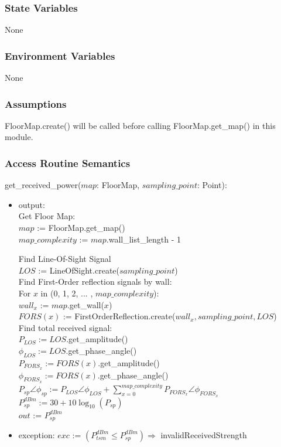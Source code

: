 \documentclass[12pt, titlepage]{article}
\begin{document}
\subsubsection{State Variables} None

\subsubsection{Environment Variables} None

\subsubsection{Assumptions} FloorMap.create() will be called before calling FloorMap.get\_map() in this module.

\subsubsection{Access Routine Semantics}

\noindent get\_received\_power($map$: FloorMap, $sampling\_point$: Point):
\begin{itemize}
\item output:\\
Get Floor Map:\\
$map$ := FloorMap.get\_map()\\
$map\_complexity$ := $map$.wall\_list\_length - 1

Find Line-Of-Sight Signal\\
$LOS$ := LineOfSight.create($sampling\_point$)\\

Find First-Order reflection signals by wall:\\
For $x$ in (0, 1, 2, ... , $map\_complexity$):\\
$wall_x$ := $map$.get\_wall($x$)\\
$FORS(x)$ := FirstOrderReflection.create($wall_x, sampling\_point, LOS$)\\

Find total received signal:\\
$P_{LOS} := LOS.$get\_amplitude()\\
$\phi_{LOS} := LOS.$get\_phase\_angle()\\
$P_{FORS_x} := FORS(x).$get\_amplitude()\\
$\phi_{FORS_x} := FORS(x).$get\_phase\_angle()\\
$P_{sp}\angle\phi_{sp} := P_{LOS}\angle\phi_{LOS} + \sum_{x = 0}^{map\_complexity}P_{FORS_x}\angle\phi_{FORS_x}$\\
$P_{sp}^{dBm} := 30 + 10\log_{10}(P_{sp})$\\
$out$ := $P_{sp}^{dBm}$
\item exception: $exc$ := $(P_{tsm}^{dBm} \leq P_{sp}^{dBm}) \Rightarrow$ invalidReceivedStrength
\end{itemize}
\end{document}
